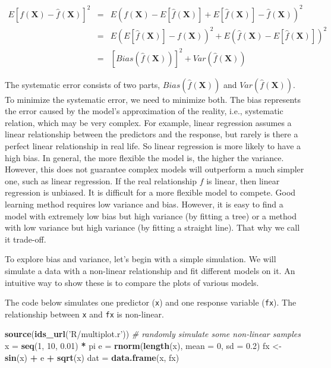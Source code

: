 \documentclass[12pt,]{krantz}
\makeatletter
\newenvironment{Shaded}{\begin{snugshade}}{\end{snugshade}}
\newcommand{\CommentTok}[1]{\textcolor[rgb]{0.37,0.37,0.37}{\textit{#1}}}
\newcommand{\DataTypeTok}[1]{\textcolor[rgb]{0.27,0.27,0.27}{#1}}
\newcommand{\DecValTok}[1]{\textcolor[rgb]{0.06,0.06,0.06}{#1}}
\newcommand{\FloatTok}[1]{\textcolor[rgb]{0.06,0.06,0.06}{#1}}
\newcommand{\KeywordTok}[1]{\textcolor[rgb]{0.27,0.27,0.27}{\textbf{#1}}}
\newcommand{\NormalTok}[1]{#1}
\newcommand{\OperatorTok}[1]{\textcolor[rgb]{0.43,0.43,0.43}{\textbf{#1}}}
\newcommand{\StringTok}[1]{\textcolor[rgb]{0.5,0.5,0.5}{#1}}
\newenvironment{kframe}{%
\medskip{}
\setlength{\fboxsep}{.8em}
 \def\at@end@of@kframe{}%
 \ifinner\ifhmode%
  \def\at@end@of@kframe{\end{minipage}}%
  \begin{minipage}{\columnwidth}%
 \fi\fi%
 \def\FrameCommand##1{\hskip\@totalleftmargin \hskip-\fboxsep
 \colorbox{shadecolor}{##1}\hskip-\fboxsep
     \hskip-\linewidth \hskip-\@totalleftmargin \hskip\columnwidth}%
 \MakeFramed {\advance\hsize-\width
   \@totalleftmargin\z@ \linewidth\hsize
   \@setminipage}}%
 {\par\unskip\endMakeFramed%
 \at@end@of@kframe}
\renewenvironment{Shaded}{\begin{kframe}}{\end{kframe}}
\makeatother
\begin{document}
\begin{equation}
\begin{array}{ccc}
E[f(\mathbf{X})-\hat{f}(\mathbf{X})]^{2} & = & E\left(f(\mathbf{X})-E[\hat{f}(\mathbf{X})]+E[\hat{f}(\mathbf{X})]-\hat{f}(\mathbf{X})\right)^{2}\\
 & = & E\left(E[\hat{f}(\mathbf{X})]-f(\mathbf{X})\right)^{2}+E\left(\hat{f}(\mathbf{X})-E[\hat{f}(\mathbf{X})]\right)^{2}\\
 & = & [Bias(\hat{f}(\mathbf{X}))]^{2}+Var(\hat{f}(\mathbf{X}))
\end{array}
\label{eq:biasvariance}
\end{equation}

The systematic error consists of two parts, \(Bias(\hat{f}(\mathbf{X}))\) and \(Var (\hat{f}(\mathbf{X}))\). To minimize the systematic error, we need to minimize both. The bias represents the error caused by the model's approximation of the reality, i.e., systematic relation, which may be very complex. For example, linear regression assumes a linear relationship between the predictors and the response, but rarely is there a perfect linear relationship in real life. So linear regression is more likely to have a high bias. In general, the more flexible the model is, the higher the variance. However, this does not guarantee complex models will outperform a much simpler one, such as linear regression. If the real relationship \(f\) is linear, then linear regression is unbiased. It is difficult for a more flexible model to compete. Good learning method requires low variance and bias. However, it is easy to find a model with extremely low bias but high variance (by fitting a tree) or a method with low variance but high variance (by fitting a straight line). That why we call it trade-off.

To explore bias and variance, let's begin with a simple simulation. We will simulate a data with a non-linear relationship and fit different models on it. An intuitive way to show these is to compare the plots of various models.

The code below simulates one predictor (\texttt{x}) and one response variable (\texttt{fx}). The relationship between \texttt{x} and \texttt{fx} is non-linear.

\begin{Shaded}
\begin{Highlighting}[]
\KeywordTok{source}\NormalTok{(}\KeywordTok{ids_url}\NormalTok{(}\StringTok{'R/multiplot.r'}\NormalTok{))}
\CommentTok{# randomly simulate some non-linear samples}
\NormalTok{x =}\StringTok{ }\KeywordTok{seq}\NormalTok{(}\DecValTok{1}\NormalTok{, }\DecValTok{10}\NormalTok{, }\FloatTok{0.01}\NormalTok{) }\OperatorTok{*}\StringTok{ }\NormalTok{pi}
\NormalTok{e =}\StringTok{ }\KeywordTok{rnorm}\NormalTok{(}\KeywordTok{length}\NormalTok{(x), }\DataTypeTok{mean =} \DecValTok{0}\NormalTok{, }\DataTypeTok{sd =} \FloatTok{0.2}\NormalTok{)}
\NormalTok{fx <-}\StringTok{ }\KeywordTok{sin}\NormalTok{(x) }\OperatorTok{+}\StringTok{ }\NormalTok{e }\OperatorTok{+}\StringTok{ }\KeywordTok{sqrt}\NormalTok{(x)}
\NormalTok{dat =}\StringTok{ }\KeywordTok{data.frame}\NormalTok{(x, fx)}
\end{Highlighting}
\end{Shaded}
\end{document}
